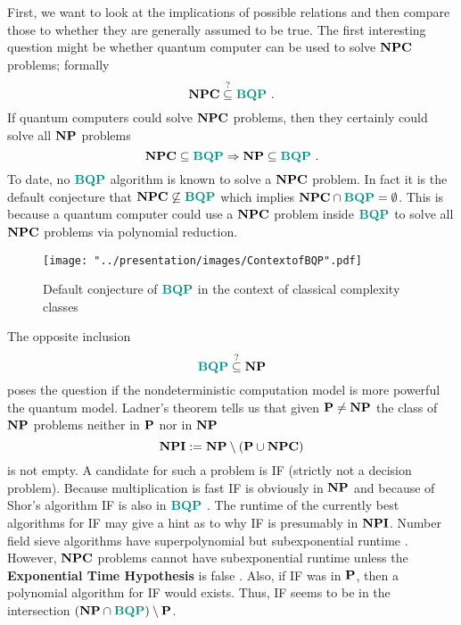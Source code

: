 First, we want to look at the implications of possible relations and then compare those to whether they are generally assumed to be true.
The first interesting question might be whether quantum computer can be used to solve $\NPC$ problems; formally
\begin{equation*}
    \NPC\overset{?}{\subseteq}\BQP
    \ .
\end{equation*}
If quantum computers could solve $\NPC$ problems, then they certainly could solve all $\NP$ problems
\begin{equation}
    \NPC\subseteq\BQP
    \Rightarrow
    \NP\subseteq\BQP
    \ .
\end{equation}
To date, no $\BQP$ algorithm is known to solve a $\NPC$ problem.
In fact it is the default conjecture that $\NPC\not\subseteq\BQP$ which implies $\NPC\cap\BQP=\emptyset$.
This is because a quantum computer could use a $\NPC$ problem inside $\BQP$ to solve all $\NPC$ problems via polynomial reduction.

\begin{figure}[t!]
\centering
\texttt{[image: "../presentation/images/ContextofBQP".pdf]}
\caption{Default conjecture of $\BQP$ in the context of classical complexity classes}
\label{fig:overview}
\end{figure}

The opposite inclusion
\begin{equation*}
    \BQP\overset{?}{\subseteq}\NP
\end{equation*}
poses the question if the nondeterministic computation model is more powerful the quantum model.
Ladner's theorem \cite{ladner_1975} tells us that given $\P\neq\NP$ the class of $\NP$ problems neither in $\P$ nor in $\NP$
\begin{equation*}
    \NPI:=\NP\setminus(\P\cup\NPC)
\end{equation*}
is not empty.
A candidate for such a problem is \ac{IF} (strictly not a decision problem).
Because multiplication is fast \ac{IF} is obviously in $\NP$ and because of Shor's algorithm \ac{IF} is also in $\BQP$ \cite{shor_1997}.
The runtime of the currently best algorithms for \ac{IF} may give a hint as to why \ac{IF} is presumably in $\NPI$.
Number field sieve algorithms have superpolynomial but subexponential runtime \cite{pomerance_1996}.
However, $\NPC$ problems cannot have subexponential runtime unless the \textbf{Exponential Time Hypothesis} is false \cite{impagliazzo_paturi_1999}.
Also, if \ac{IF} was in $\P$, then a polynomial algorithm for \ac{IF} would exists.
Thus, \ac{IF} seems to be in the intersection $(\NP\cap\BQP)\setminus\P$.

